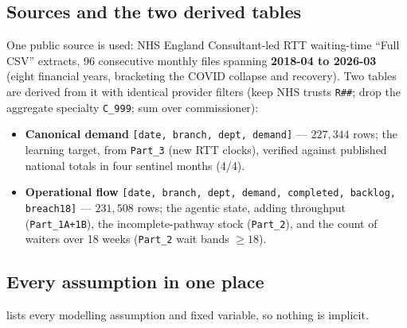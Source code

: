 \documentclass[11pt,a4paper]{article}
\begin{document}
\subsection{Sources and the two derived tables}
One public source is used: NHS England Consultant-led RTT waiting-time ``Full CSV'' extracts, 96
consecutive monthly files spanning \textbf{2018-04 to 2026-03} (eight financial years, bracketing the
COVID collapse and recovery). Two tables are derived from it with identical provider filters (keep NHS
trusts \texttt{R\#\#}; drop the aggregate specialty \texttt{C\_999}; sum over commissioner):
\begin{itemize}[nosep]
  \item \textbf{Canonical demand} \texttt{[date, branch, dept, demand]} --- $227{,}344$ rows; the
        learning target, from \texttt{Part\_3} (new RTT clocks), verified against published national
        totals in four sentinel months (4/4).
  \item \textbf{Operational flow} \texttt{[date, branch, dept, demand, completed, backlog, breach18]}
        --- $231{,}508$ rows; the agentic state, adding throughput (\texttt{Part\_1A+1B}), the
        incomplete-pathway stock (\texttt{Part\_2}), and the count of waiters over 18 weeks
        (\texttt{Part\_2} wait bands $\geq 18$).
\end{itemize}

\subsection{Every assumption in one place}
 lists every modelling assumption and fixed variable, so nothing is implicit.
\end{document}

